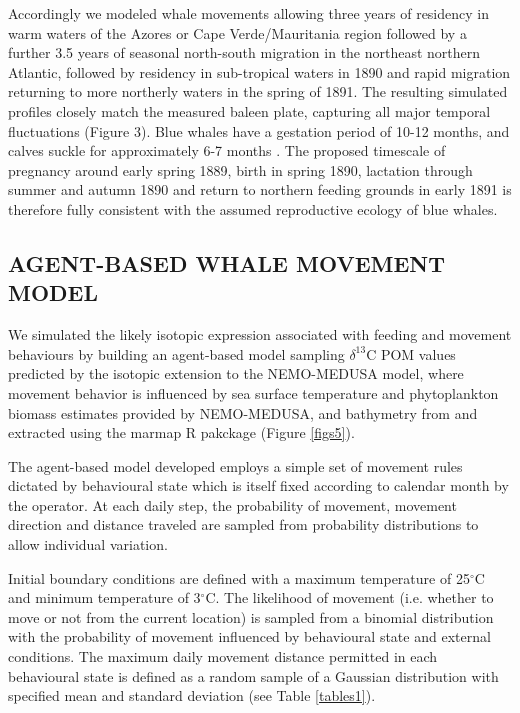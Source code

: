 \documentclass[a4paper,12pt]{article}
\begin{document}
Accordingly we modeled whale movements allowing three years of residency in warm waters of the Azores or Cape Verde/Mauritania region followed by a further 3.5 years of seasonal north-south migration in the northeast northern Atlantic, followed by residency in sub-tropical waters in 1890 and rapid migration returning to more northerly waters in the spring of 1891. 
The resulting simulated profiles closely match the measured baleen plate, capturing all major temporal fluctuations (Figure 3). 
Blue whales have a gestation period of 10-12 months, and calves suckle for approximately 6-7 months \cite{handbook}. 
The proposed timescale of pregnancy around early spring 1889, birth in spring 1890, lactation through summer and autumn 1890 and return to northern feeding grounds in early 1891 is therefore fully consistent with the assumed reproductive ecology of blue whales.

\subsection*{AGENT-BASED WHALE MOVEMENT MODEL}
We simulated the likely isotopic expression associated with feeding and movement behaviours by building an agent-based model sampling $\delta^{13}$C POM values predicted by the isotopic extension to the NEMO-MEDUSA model\cite{magozzi2017using,yool2013medusa}, where movement behavior is influenced by sea surface temperature and phytoplankton biomass estimates provided by NEMO-MEDUSA\cite{yool2013medusa}, and bathymetry from\cite{bathy} and extracted using the marmap R pakckage\cite{marmap} (Figure \ref{figs5}).
 
The agent-based model developed employs a simple set of movement rules dictated by behavioural state which is itself fixed according to calendar month by the operator. 
At each daily step, the probability of movement, movement direction and distance traveled are sampled from probability distributions to allow individual variation.

Initial boundary conditions are defined with a maximum temperature of 25$^{\circ}$C and minimum temperature of 3$^{\circ}$C. 
The likelihood of movement (i.e. whether to move or not from the current location) is sampled from a binomial distribution with the probability of movement influenced by behavioural state and external conditions. 
The maximum daily movement distance permitted in each behavioural state is defined as a random sample of a Gaussian distribution with specified mean and standard deviation (see Table \ref{tables1}).
 
\end{document}
